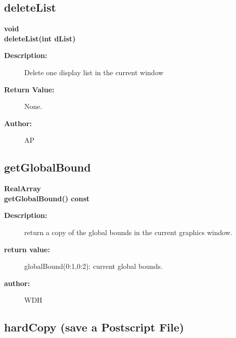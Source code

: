 \subsection{deleteList}
 
\begin{flushleft} \textbf{%
void  \\ 
\settowidth{\GLGraphicsInterfaceIncludeArgIndent}{deleteList(}%
deleteList(int dList)
}\end{flushleft}
\begin{description}
\item[{\bf Description:}] 
   Delete one display list in the current window

\item[{\bf Return Value:}]  None.

\item[{\bf Author:}]  AP
\end{description}
\subsection{getGlobalBound}
 
\begin{flushleft} \textbf{%
RealArray   \\ 
\settowidth{\GLGraphicsInterfaceIncludeArgIndent}{getGlobalBound(}%
getGlobalBound() const
}\end{flushleft}
\begin{description}
\item[{\bf Description:}] 
   return a copy of the global bounds in the current graphics window.
\item[{\bf return value:}]  globalBound(0:1,0:2): current global bounds.

\item[{\bf author:}]  WDH
\end{description}
\subsection{hardCopy (save a Postscript File)}
 
